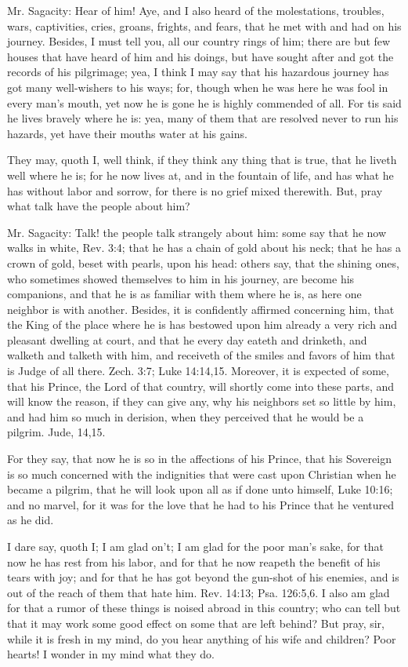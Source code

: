 Mr. Sagacity: Hear of him! Aye, and I also heard of the molestations, troubles, wars, captivities, cries, groans, frights, and fears, that he met with and had on his journey. Besides, I must tell you, all our country rings of him; there are but few houses that have heard of him and his doings, but have sought after and got the records of his pilgrimage; yea, I think I may say that his hazardous journey has got many well-wishers to his ways; for, though when he was here he was fool in every man's mouth, yet now he is gone he is highly commended of all. For tis said he lives bravely where he is: yea, many of them that are resolved never to run his hazards, yet have their mouths water at his gains.

They may, quoth I, well think, if they think any thing that is true, that he liveth well where he is; for he now lives at, and in the fountain of life, and has what he has without labor and sorrow, for there is no grief mixed therewith. But, pray what talk have the people about him?

Mr. Sagacity: Talk! the people talk strangely about him: some say that he now walks in white, Rev. 3:4; that he has a chain of gold about his neck; that he has a crown of gold, beset with pearls, upon his head: others say, that the shining ones, who sometimes showed themselves to him in his journey, are become his companions, and that he is as familiar with them where he is, as here one neighbor is with another. Besides, it is confidently affirmed concerning him, that the King of the place where he is has bestowed upon him already a very rich and pleasant dwelling at court, and that he every day eateth and drinketh, and walketh and talketh with him, and receiveth of the smiles and favors of him that is Judge of all there. Zech. 3:7; Luke 14:14,15. Moreover, it is expected of some, that his Prince, the Lord of that country, will shortly come into these parts, and will know the reason, if they can give any, why his neighbors set so little by him, and had him so much in derision, when they perceived that he would be a pilgrim. Jude, 14,15.

For they say, that now he is so in the affections of his Prince, that his Sovereign is so much concerned with the indignities that were cast upon Christian when he became a pilgrim, that he will look upon all as if done unto himself, Luke 10:16; and no marvel, for it was for the love that he had to his Prince that he ventured as he did.

I dare say, quoth I; I am glad on't; I am glad for the poor man's sake, for that now he has rest from his labor, and for that he now reapeth the benefit of his tears with joy; and for that he has got beyond the gun-shot of his enemies, and is out of the reach of them that hate him. Rev. 14:13; Psa. 126:5,6. I also am glad for that a rumor of these things is noised abroad in this country; who can tell but that it may work some good effect on some that are left behind? But pray, sir, while it is fresh in my mind, do you hear anything of his wife and children? Poor hearts! I wonder in my mind what they do.

